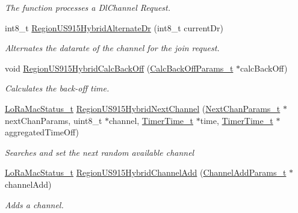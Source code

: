 \begin{DoxyCompactItemize}
\begin{DoxyCompactList}\small\item\em The function processes a Dl\+Channel Request. \end{DoxyCompactList}\item 
int8\+\_\+t \mbox{\hyperlink{group___r_e_g_i_o_n_u_s915_h_y_b_gac169f8bcedf244520310b47ba0877a0c}{Region\+U\+S915\+Hybrid\+Alternate\+Dr}} (int8\+\_\+t current\+Dr)
\begin{DoxyCompactList}\small\item\em Alternates the datarate of the channel for the join request. \end{DoxyCompactList}\item 
void \mbox{\hyperlink{group___r_e_g_i_o_n_u_s915_h_y_b_ga410890efd066c15fb3452cf8ae8362e9}{Region\+U\+S915\+Hybrid\+Calc\+Back\+Off}} (\mbox{\hyperlink{group___r_e_g_i_o_n_ga7c5c9a8da174e6679eded8257dc92fd9}{Calc\+Back\+Off\+Params\+\_\+t}} $\ast$calc\+Back\+Off)
\begin{DoxyCompactList}\small\item\em Calculates the back-\/off time. \end{DoxyCompactList}\item 
\mbox{\hyperlink{group___l_o_r_a_m_a_c_ga30bd25657e10480f8605ee951b0ecfbd}{Lo\+Ra\+Mac\+Status\+\_\+t}} \mbox{\hyperlink{group___r_e_g_i_o_n_u_s915_h_y_b_gae74c05f827a9ed78b0ec0cacdec45f28}{Region\+U\+S915\+Hybrid\+Next\+Channel}} (\mbox{\hyperlink{group___r_e_g_i_o_n_ga115f5e83afae352c0a3dcdc193374040}{Next\+Chan\+Params\+\_\+t}} $\ast$next\+Chan\+Params, uint8\+\_\+t $\ast$channel, \mbox{\hyperlink{utilities_8h_a4215ca43d3e953099ea758ce428599d0}{Timer\+Time\+\_\+t}} $\ast$time, \mbox{\hyperlink{utilities_8h_a4215ca43d3e953099ea758ce428599d0}{Timer\+Time\+\_\+t}} $\ast$aggregated\+Time\+Off)
\begin{DoxyCompactList}\small\item\em Searches and set the next random available channel \end{DoxyCompactList}\item 
\mbox{\hyperlink{group___l_o_r_a_m_a_c_ga30bd25657e10480f8605ee951b0ecfbd}{Lo\+Ra\+Mac\+Status\+\_\+t}} \mbox{\hyperlink{group___r_e_g_i_o_n_u_s915_h_y_b_ga82fc4da7c52d7b26a8fcd8704c8af9ab}{Region\+U\+S915\+Hybrid\+Channel\+Add}} (\mbox{\hyperlink{group___r_e_g_i_o_n_gab1c5f3aa06614283202906cef4417860}{Channel\+Add\+Params\+\_\+t}} $\ast$channel\+Add)
\begin{DoxyCompactList}\small\item\em Adds a channel. \end{DoxyCompactList}\item 

\end{DoxyCompactItemize}
